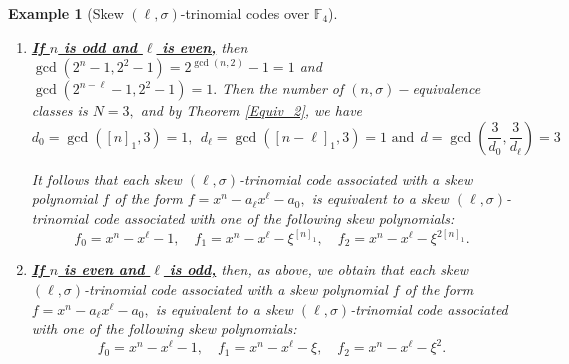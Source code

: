 \documentclass[12pt,paper]{article}
\theoremstyle{plain}
\newtheorem{example}[theorem]{Example}
\begin{document}
\begin{example}[Skew $(\ell,\sigma)$-trinomial  codes  over $\mathbb{F}_4$]
\begin{enumerate}
  \item \underline{\textbf{If $n$  is odd and $\ell$ is even,}}   then
  $ \gcd( 2^{n}-1 ,  2^2-1 )=2^{\gcd(n,2)}-1=1 $ and
  $ \gcd( 2^{n-\ell}-1 ,  2^2-1 )= 1.$  Then the number of $(n,\sigma)-$equivalence classes is $N=3,$ 
and by Theorem \ref{Equiv_2}, we have 
     $$d_0=\gcd( [n]_1, 3)= 1,\ \ d_{\ell}= \gcd([n-\ell]_1, 3)= 1 \text{ and} \ \  d=\gcd\left( \frac{3}{d_0}, \frac{3}{d_{\ell}}\right)=3$$
    
 It follows that each skew $(\ell,\sigma)$-trinomial  code associated with a skew  polynomial $f$ of the form  $f =x^{n}- a_{\ell} x^{\ell}-a_0,$ is equivalent to a skew $(\ell,\sigma)$-trinomial  code  associated with one of the following  skew polynomials: 
$$f_{0}= x^{n} - x^{\ell} - 1 , \quad f_{1}= x^{n} -  x^{\ell} -   \xi^{[n]_1},  \quad  f_{2}= x^{n} -   x^{\ell} -  \xi^{2[n]_1}.  $$

 \item \underline{\textbf{If $n$  is even and  $\ell$ is odd,}} then,  as above, we obtain that  each skew $(\ell,\sigma)$-trinomial  code associated with a skew  polynomial $f$ of the form  $f =x^{n}- a_{\ell} x^{\ell}-a_0,$ is equivalent to a skew $(\ell,\sigma)$-trinomial  code  associated with one of the following  skew polynomials:
 $$f_{0}= x^{n} - x^{\ell} - 1 , \quad f_{1}= x^{n} - x^{\ell} - \xi,  \quad  f_{2}= x^{n} - x^{\ell} - \xi^2 .  $$
   
 \end{enumerate}
 \end{example}
\end{document}
